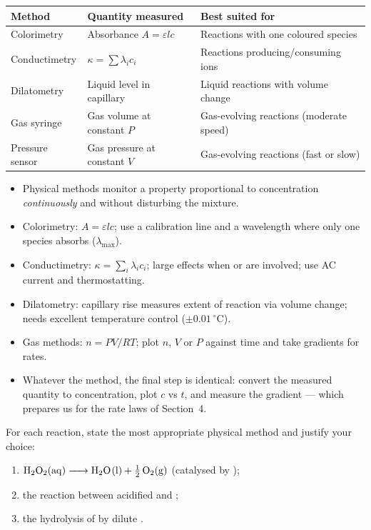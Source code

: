 \documentclass[11pt]{article}
\begin{document}
\begin{center}
\begin{tabularx}{\linewidth}{|l|X|X|}
\hline
\rowcolor{popblueL} \textbf{Method} & \textbf{Quantity measured} & \textbf{Best suited for} \\
\hline
Colorimetry & Absorbance $A=\varepsilon l c$ & Reactions with one coloured species \\
\hline
Conductimetry & $\kappa = \sum \lambda_i c_i$ & Reactions producing/consuming ions \\
\hline
Dilatometry & Liquid level in capillary & Liquid reactions with volume change \\
\hline
Gas syringe & Gas volume at constant $P$ & Gas-evolving reactions (moderate speed) \\
\hline
Pressure sensor & Gas pressure at constant $V$ & Gas-evolving reactions (fast or slow) \\
\hline
\end{tabularx}
\end{center}

\begin{aretenir}
\begin{itemize}
\item Physical methods monitor a property proportional to concentration \emph{continuously} and without disturbing the mixture.
\item Colorimetry: $A = \varepsilon l c$; use a calibration line and a wavelength where only one species absorbs ($\lambda_{\max}$).
\item Conductimetry: $\kappa = \sum_i \lambda_i c_i$; large effects when  or  are involved; use AC current and thermostatting.
\item Dilatometry: capillary rise measures extent of reaction via volume change; needs excellent temperature control ($\pm 0.01\ ^{\circ}\mathrm{C}$).
\item Gas methods: $n = PV/RT$; plot $n$, $V$ or $P$ against time and take gradients for rates.
\item Whatever the method, the final step is identical: convert the measured quantity to concentration, plot $c$ vs $t$, and measure the gradient --- which prepares us for the rate laws of Section~4.
\end{itemize}
\end{aretenir}

\begin{exercice}
For each reaction, state the most appropriate physical method and justify your choice:
\begin{enumerate}
\item $\ce{H2O2(aq) -> H2O(l) + 1/2 O2(g)}$ (catalysed by );
\item the reaction between acidified  and ;
\item the hydrolysis of  by dilute .
\end{enumerate}
\end{exercice}
\end{document}
